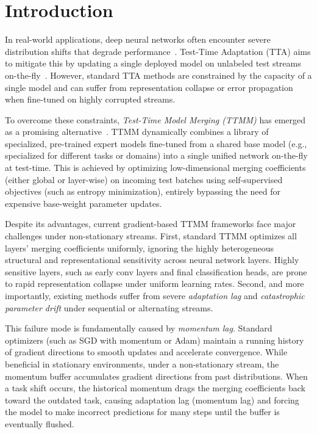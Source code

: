 \documentclass{article}
\theoremstyle{plain}
\theoremstyle{definition}
\theoremstyle{remark}
\begin{document}
\section{Introduction}
\label{sec:intro}

In real-world applications, deep neural networks often encounter severe distribution shifts that degrade performance~\citep{lecun2015deep}. Test-Time Adaptation (TTA) aims to mitigate this by updating a single deployed model on unlabeled test streams on-the-fly~\citep{wang2021tent}. However, standard TTA methods are constrained by the capacity of a single model and can suffer from representation collapse or error propagation when fine-tuned on highly corrupted streams. 

To overcome these constraints, \emph{Test-Time Model Merging (TTMM)} has emerged as a promising alternative~\citep{wortsman2022model}. TTMM dynamically combines a library of specialized, pre-trained expert models fine-tuned from a shared base model (e.g., specialized for different tasks or domains) into a single unified network on-the-fly at test-time. This is achieved by optimizing low-dimensional merging coefficients (either global or layer-wise) on incoming test batches using self-supervised objectives (such as entropy minimization), entirely bypassing the need for expensive base-weight parameter updates.

Despite its advantages, current gradient-based TTMM frameworks face major challenges under non-stationary streams. First, standard TTMM optimizes all layers' merging coefficients uniformly, ignoring the highly heterogeneous structural and representational sensitivity across neural network layers. Highly sensitive layers, such as early conv layers and final classification heads, are prone to rapid representation collapse under uniform learning rates. Second, and more importantly, existing methods suffer from severe \emph{adaptation lag} and \emph{catastrophic parameter drift} under sequential or alternating streams. 

This failure mode is fundamentally caused by \emph{momentum lag}. Standard optimizers (such as SGD with momentum or Adam) maintain a running history of gradient directions to smooth updates and accelerate convergence. While beneficial in stationary environments, under a non-stationary stream, the momentum buffer accumulates gradient directions from past distributions. When a task shift occurs, the historical momentum drags the merging coefficients back toward the outdated task, causing adaptation lag (momentum lag) and forcing the model to make incorrect predictions for many steps until the buffer is eventually flushed.
\end{document}
